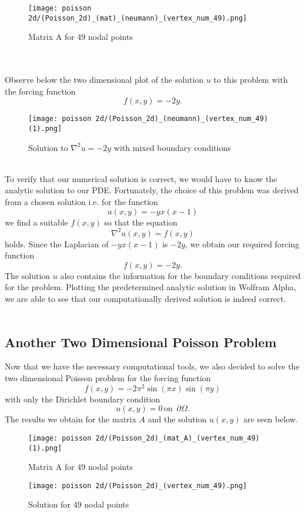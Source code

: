 \documentclass{article}
\begin{document}
 \begin{figure}[t!]
    \centering
    \texttt{[image: poisson 2d/(Poisson\_2d)\_(mat)\_(neumann)\_(vertex\_num\_49).png]}
    \caption{Matrix A for 49 nodal points}
    \label{fig:basis}
\end{figure}
\\
\\
Observe below the two dimensional plot of the solution $u$ to this problem with the forcing function $$f(x,y) = -2y.$$ 
\begin{figure}[hbt!]
    \centering
    \texttt{[image: poisson 2d/(Poisson\_2d)\_(neumann)\_(vertex\_num\_49) (1).png]}
    \caption{Solution to $\nabla^{2}u = -2y$ with mixed boundary conditions}
    \label{fig:basis}
\end{figure}
\\
To verify that our numerical solution is correct, we would have to know the analytic solution to our PDE. Fortunately, the choice of this problem was derived from a chosen solution i.e. for the function $$u(x,y) = -yx(x-1)$$ we find a suitable $f(x,y)$ so that the equation \[\nabla^{2}u(x,y) = f(x,y)\] holds. Since the Laplacian of $-yx(x-1)$ is $-2y$, we obtain our required forcing function $$f(x,y) = -2y.$$ The solution $u$ also contains the information for the boundary conditions required for the problem. Plotting the predetermined analytic solution in Wolfram Alpha, we are able to see that our computationally derived solution is indeed correct. 
\\
\\ 
\subsection{Another Two Dimensional Poisson Problem}
Now that we have the necessary computational tools, we also decided to solve the two dimensional Poisson problem for the forcing function $$f(x,y) = - 2\pi^2\sin{(\pi x)}\sin{(\pi y)}$$
with only the Dirichlet boundary condition $$u(x,y) = 0 \, \textrm{on } \,\partial\Omega. $$ The results we obtain for the matrix $A$ and the solution $u(x,y)$ are seen below.
\begin{figure}[hbt!]
\centering
\begin{minipage}{.5\textwidth}
    \centering
    \texttt{[image: poisson 2d/(Poisson\_2d)\_(mat\_A)\_(vertex\_num\_49) (1).png]}
    \caption{Matrix A for 49 nodal points}
    \label{fig:Solution}

\end{minipage}%
\begin{minipage}{.5\textwidth}
    \centering
    \texttt{[image: poisson 2d/(Poisson\_2d)\_(vertex\_num\_49).png]}
    \caption{Solution for 49 nodal points}
    \label{fig:Solution}

\end{minipage}
\end{figure}
\end{document}
